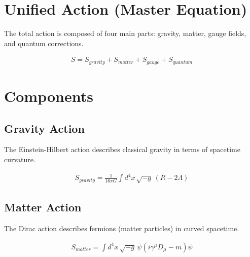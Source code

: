 \documentclass{article}
\begin{document}
\section*{Unified Action (Master Equation)}

The total action is composed of four main parts: gravity, matter, gauge fields, and quantum corrections.

\begin{align}
S=S_{gravity}+S_{matter}+S_{gauge}+S_{quantum}
\end{align}

\section*{Components}


\subsection*{Gravity Action}

The Einstein-Hilbert action describes classical gravity in terms of spacetime curvature.

\begin{align}
S_{gravity} = \frac{1}{16\pi G} \int d^4x \, \sqrt{-g} \, (R - 2\Lambda)
\end{align}

\subsection*{Matter Action}

The Dirac action describes fermions (matter particles) in curved spacetime.

\begin{align}
S_{matter} = \int d^4x \, \sqrt{-g} \, \bar{\psi} (i \gamma^\mu D_\mu - m) \psi
\end{align}
\end{document}
